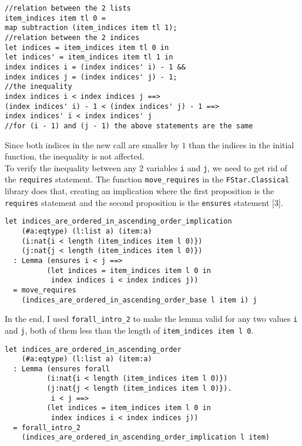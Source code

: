 \begin{verbatim}
//relation between the 2 lists
item_indices item tl 0 = 
map subtraction (item_indices item tl 1);
//relation between the 2 indices
let indices = item_indices item tl 0 in
let indices' = item_indices item tl 1 in
index indices i = (index indices' i) - 1 &&
index indices j = (index indices' j) - 1;
//the inequality
index indices i < index indices j ==>
(index indices' i) - 1 < (index indices' j) - 1 ==>
index indices' i < index indices' j
//for (i - 1) and (j - 1) the above statements are the same
\end{verbatim}

Since both indices in the new call are smaller by \(1\) than the indices in the initial function, the inequality is not affected. \\ 
\indent To verify the inequality between any \(2\) variables \texttt{i} and \texttt{j}, we need to get rid of the \texttt{requires} statement. The function \texttt{move\_requires} in the \texttt{FStar.Classical} library does that, creating an implication where the first proposition is the \texttt{requires} statement and the second proposition is the \texttt{ensures} statement [\(3\)].

\begin{verbatim}
let indices_are_ordered_in_ascending_order_implication
    (#a:eqtype) (l:list a) (item:a) 
    (i:nat{i < length (item_indices item l 0)}) 
    (j:nat{j < length (item_indices item l 0)})
  : Lemma (ensures i < j ==>
          (let indices = item_indices item l 0 in 
           index indices i < index indices j))
  = move_requires 
    (indices_are_ordered_in_ascending_order_base l item i) j
\end{verbatim}

In the end, I used \texttt{forall\_intro\_2} to make the lemma valid for any two values \texttt{i} and \texttt{j}, both of them less than the length of \texttt{item\_indices item l 0}.

\begin{verbatim}
let indices_are_ordered_in_ascending_order
    (#a:eqtype) (l:list a) (item:a) 
  : Lemma (ensures forall 
          (i:nat{i < length (item_indices item l 0)}) 
          (j:nat{j < length (item_indices item l 0)}).
           i < j ==>
          (let indices = item_indices item l 0 in 
           index indices i < index indices j))
  = forall_intro_2
    (indices_are_ordered_in_ascending_order_implication l item) 
\end{verbatim}


